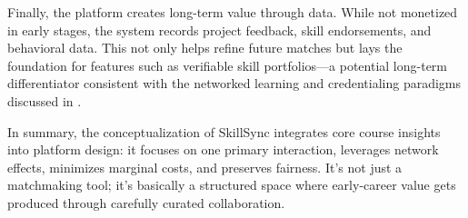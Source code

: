 Finally, the platform creates long-term value through data. While not monetized in early stages, the system records project feedback, skill endorsements, and behavioral data. This not only helps refine future matches but lays the foundation for features such as verifiable skill portfolios---a potential long-term differentiator consistent with the networked learning and credentialing paradigms discussed in \citet{Zuboff2019}.

In summary, the conceptualization of SkillSync integrates core course insights into platform design: it focuses on one primary interaction, leverages network effects, minimizes marginal costs, and preserves fairness. It's not just a matchmaking tool; it's basically a structured space where early-career value gets produced through carefully curated collaboration.
